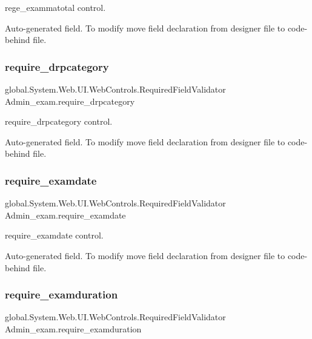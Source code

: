 rege\+\_\+exammatotal control. 

Auto-\/generated field. To modify move field declaration from designer file to code-\/behind file. \mbox{\label{class_admin__exam_a7fe603aaebc33d743aa241a023689e62}} 
\subsubsection{\texorpdfstring{require\_drpcategory}{require\_drpcategory}}
{\footnotesize\ttfamily global.\+System.\+Web.\+U\+I.\+Web\+Controls.\+Required\+Field\+Validator Admin\+\_\+exam.\+require\+\_\+drpcategory\hspace{0.3cm}{\ttfamily [protected]}}



require\+\_\+drpcategory control. 

Auto-\/generated field. To modify move field declaration from designer file to code-\/behind file. \mbox{\label{class_admin__exam_ad434173b5922eb147ea490d8817bbc6c}} 
\subsubsection{\texorpdfstring{require\_examdate}{require\_examdate}}
{\footnotesize\ttfamily global.\+System.\+Web.\+U\+I.\+Web\+Controls.\+Required\+Field\+Validator Admin\+\_\+exam.\+require\+\_\+examdate\hspace{0.3cm}{\ttfamily [protected]}}



require\+\_\+examdate control. 

Auto-\/generated field. To modify move field declaration from designer file to code-\/behind file. \mbox{\label{class_admin__exam_ae0f02ff019e950f34484b1da334ed16f}} 
\subsubsection{\texorpdfstring{require\_examduration}{require\_examduration}}
{\footnotesize\ttfamily global.\+System.\+Web.\+U\+I.\+Web\+Controls.\+Required\+Field\+Validator Admin\+\_\+exam.\+require\+\_\+examduration\hspace{0.3cm}{\ttfamily [protected]}}



